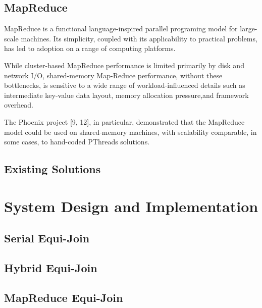 \documentclass[10pt,twocolumn]{witseiepaper}
\begin{document}
\subsection{MapReduce}

MapReduce is a functional language-inspired parallel programing model for large-scale machines. Its simplicity, coupled with its applicability to practical problems, has led to adoption on a range of computing platforms. 

While cluster-based MapReduce performance is limited primarily by disk and network I/O, shared-memory Map-Reduce performance, without these bottlenecks, is sensitive to a wide range of workload-influenced details such as intermediate key-value data layout, memory allocation pressure,and framework overhead.

The Phoenix project [9, 12], in particular, demonstrated that the MapReduce model could be used on shared-memory machines, with scalability comparable, in some cases, to hand-coded PThreads solutions.

\subsection{Existing Solutions}

\section{System Design and Implementation}

\subsection{Serial Equi-Join}

\subsection{Hybrid Equi-Join}

\subsection{MapReduce Equi-Join}
\end{document}
